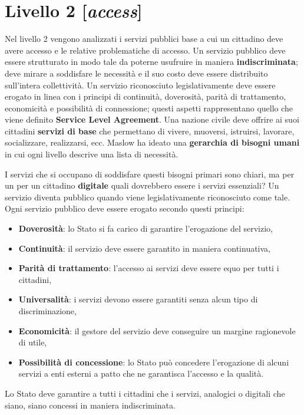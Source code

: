 \chapter{Livello 2 [\emph{access}]}
Nel livello 2 vengono analizzati i servizi pubblici base a cui un cittadino deve avere accesso e le relative problematiche di accesso. Un servizio pubblico deve essere strutturato in modo tale da poterne usufruire in maniera \textbf{indiscriminata}; deve mirare a soddisfare le necessità e il suo costo deve essere distribuito sull'intera collettività. Un servizio riconosciuto legislativamente deve essere erogato in linea con i principi di continuità, doverosità, parità di trattamento, economicità e possibilità di connessione; questi aspetti rappresentano quello che viene definito \textbf{Service Level Agreement}.
Una nazione civile deve offrire ai suoi cittadini \textbf{servizi di base} che permettano di vivere, muoversi, istruirsi, lavorare, socializzare, realizzarsi, ecc. Maslow ha ideato una \textbf{gerarchia di bisogni umani} in cui ogni livello descrive una lista di necessità. 

I servizi che si occupano di soddisfare questi bisogni primari sono chiari, ma per un per un cittadino \textbf{digitale} quali dovrebbero essere i servizi essenziali?
\bigbreak
Un servizio diventa pubblico quando viene legislativamente riconosciuto come tale. Ogni servizio pubblico deve essere erogato secondo questi principi:
\begin{itemize}
    \item \textbf{Doverosità}: lo Stato si fa carico di garantire l’erogazione del servizio,
    \item \textbf{Continuità}: il servizio deve essere garantito in maniera continuativa,
    \item \textbf{Parità di trattamento}: l’accesso ai servizi deve essere  equo per tutti i cittadini,
    \item \textbf{Universalità}: i servizi devono essere garantiti senza alcun tipo di discriminazione,
    \item \textbf{Economicità}: il gestore del servizio deve conseguire un margine ragionevole di utile,
    \item \textbf{Possibilità di concessione}: lo Stato può concedere l’erogazione di alcuni servizi a enti esterni a patto che ne garantisca l'accesso e la qualità.
\end{itemize}

\bigbreak
Lo Stato deve garantire a tutti i cittadini che i servizi, analogici o digitali che siano, siano concessi in maniera indiscriminata. 

